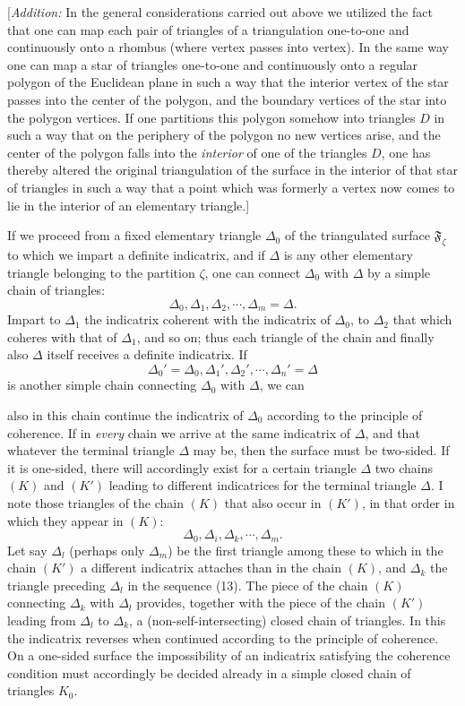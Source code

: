\documentclass{article}
\begin{document}
[\emph{Addition:} In the general considerations carried out above we utilized the fact that one can map each pair of triangles of a triangulation one-to-one and continuously onto a rhombus (where vertex passes into vertex). In the same way one can map a star of triangles one-to-one and continuously onto a regular polygon of the Euclidean plane in such a way that the interior vertex of the star passes into the center of the polygon, and the boundary vertices of the star into the polygon vertices. If one partitions this polygon somehow into triangles $D$ in such a way that on the periphery of the polygon no new vertices arise, and the center of the polygon falls into the \emph{interior} of one of the triangles $D$, one has thereby altered the original triangulation of the surface in the interior of that star of triangles in such a way that a point which was formerly a vertex now comes to lie in the interior of an elementary triangle.]

If we proceed from a fixed elementary triangle $\Delta_0$ of the triangulated surface $\mathfrak{F}_\zeta$ to which we impart a definite indicatrix, and if $\Delta$ is any other elementary triangle belonging to the partition $\zeta$, one can connect $\Delta_0$ with $\Delta$ by a simple chain of triangles:
\[ \Delta_0, \Delta_1, \Delta_2, \cdots, \Delta_m = \Delta. \tag{K} \]
Impart to $\Delta_1$ the indicatrix coherent with the indicatrix of $\Delta_0$, to $\Delta_2$ that which coheres with that of $\Delta_1$, and so on; thus each triangle of the chain and finally also $\Delta$ itself receives a definite indicatrix. If
\[ \Delta_0' = \Delta_0, \Delta_1', \Delta_2', \cdots, \Delta_n' = \Delta \tag{K'} \]
is another simple chain connecting $\Delta_0$ with $\Delta$, we can

also in this chain continue the indicatrix of $\Delta_0$ according to the principle of coherence. If in \emph{every} chain we arrive at the same indicatrix of $\Delta$, and that whatever the terminal triangle $\Delta$ may be, then the surface must be two-sided. If it is one-sided, there will accordingly exist for a certain triangle $\Delta$ two chains $(K)$ and $(K')$ leading to different indicatrices for the terminal triangle $\Delta$. I note those triangles of the chain $(K)$ that also occur in $(K')$, in that order in which they appear in $(K)$:
\[ \Delta_0, \Delta_i, \Delta_k, \cdots, \Delta_m. \tag{13} \]
Let say $\Delta_l$ (perhaps only $\Delta_m$) be the first triangle among these to which in the chain $(K')$ a different indicatrix attaches than in the chain $(K)$, and $\Delta_k$ the triangle preceding $\Delta_l$ in the sequence (13). The piece of the chain $(K)$ connecting $\Delta_k$ with $\Delta_l$ provides, together with the piece of the chain $(K')$ leading from $\Delta_l$ to $\Delta_k$, a (non-self-intersecting) closed chain of triangles. In this the indicatrix reverses when continued according to the principle of coherence. On a one-sided surface the impossibility of an indicatrix satisfying the coherence condition must accordingly be decided already in a simple closed chain of triangles $K_0$.
\end{document}

